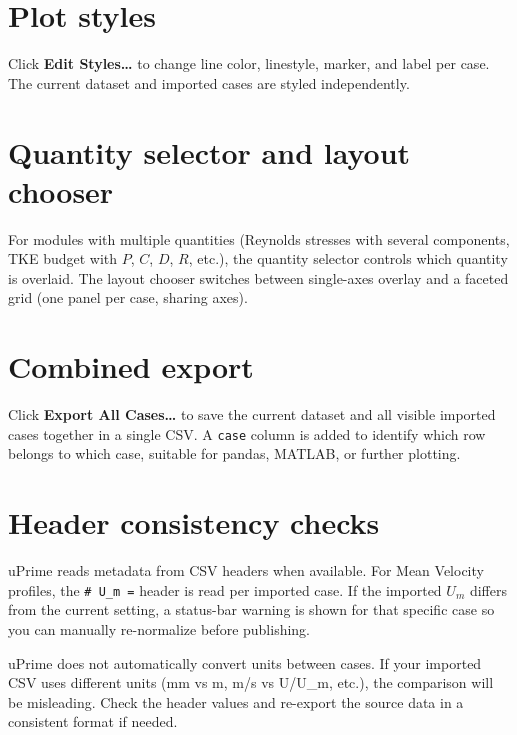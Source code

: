 \documentclass[11pt, a4paper]{report}
\newcommand{\uipth}[1]{\textbf{\textcolor{upblue}{#1}}}
\newcommand{\software}[1]{\textsf{#1}}
\begin{document}
\section{Plot styles}

Click \uipth{Edit Styles\ldots} to change line color, linestyle, marker, and label per case. The current dataset and imported cases are styled independently.

\section{Quantity selector and layout chooser}

For modules with multiple quantities (Reynolds stresses with several components, TKE budget with $P$, $C$, $D$, $R$, etc.), the quantity selector controls which quantity is overlaid. The layout chooser switches between single-axes overlay and a faceted grid (one panel per case, sharing axes).

\section{Combined export}

Click \uipth{Export All Cases\ldots} to save the current dataset and all visible imported cases together in a single CSV. A \texttt{case} column is added to identify which row belongs to which case, suitable for pandas, MATLAB, or further plotting.

\section{Header consistency checks}

\software{uPrime} reads metadata from CSV headers when available. For Mean Velocity profiles, the \texttt{\# U\_m =} header is read per imported case. If the imported $U_m$ differs from the current setting, a status-bar warning is shown for that specific case so you can manually re-normalize before publishing.

\begin{warnbox}
\software{uPrime} does not automatically convert units between cases. If your imported CSV uses different units (mm vs m, m/s vs U/U\_m, etc.), the comparison will be misleading. Check the header values and re-export the source data in a consistent format if needed.
\end{warnbox}

\end{document}
